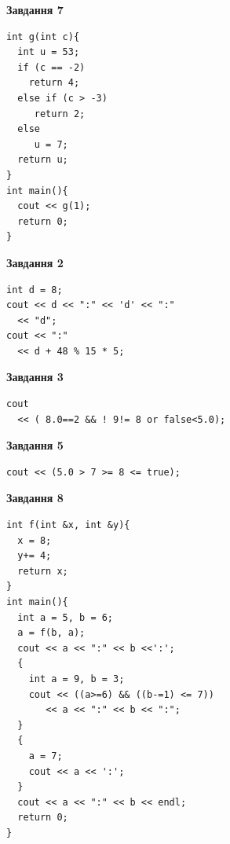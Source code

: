 \documentclass[12pt, ukrainian]{article}
\begin{document}
{\begin {large}
\begin{minipage}[t]{7.0cm}
\begin{center}
\textbf{Завдання 7}
\end{center}
\vspace{-8mm}

\begin{verbatim}
int g(int c){
  int u = 53;
  if (c == -2)
    return 4;
  else if (c > -3)
     return 2;
  else
     u = 7;
  return u;
}
int main(){
  cout << g(1);
  return 0;
}
\end{verbatim}

\end{minipage}
\vline \hspace{1mm}
\begin{minipage}[t]{11.0cm}

\begin{center}
\textbf{Завдання 2}
\end{center}
\vspace{-8mm}

\begin{verbatim}
int d = 8;
cout << d << ":" << 'd' << ":" 
  << "d";
cout << ":" 
  << d + 48 % 15 * 5;
\end{verbatim}



\begin{center}
\textbf{Завдання 3}
\end{center}
\vspace{-8mm}

\begin{verbatim}
cout 
  << ( 8.0==2 && ! 9!= 8 or false<5.0);
\end{verbatim}



\begin{center}
\textbf{Завдання 5}
\end{center}
\vspace{-8mm}

\begin{verbatim}
cout << (5.0 > 7 >= 8 <= true);
\end{verbatim}



\begin{center}
\textbf{Завдання 8}
\end{center}
\vspace{-8mm}

\begin{verbatim}
int f(int &x, int &y){
  x = 8;
  y+= 4;
  return x;
}
int main(){
  int a = 5, b = 6;
  a = f(b, a);
  cout << a << ":" << b <<':';
  {
    int a = 9, b = 3;
    cout << ((a>=6) && ((b-=1) <= 7))
       << a << ":" << b << ":";
  }
  {
    a = 7;
    cout << a << ':';
  }
  cout << a << ":" << b << endl;
  return 0;
}
\end{verbatim}


\end{minipage}
\end{large}}
\end{document}
